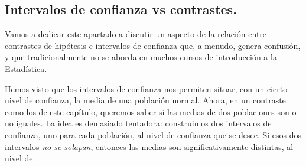 \subsection{Intervalos de confianza vs contrastes.}
\label{cap09:subsec:IntervalosDeConfianzaVsContrastes01}

Vamos a dedicar este apartado a discutir un aspecto de la relación entre contrastes de hipótesis e intervalos de confianza que, a menudo, genera confusión, y que tradicionalmente no se aborda en muchos cursos de introducción a la Estadística.

Hemos visto que los intervalos de confianza nos permiten situar, con un cierto nivel de confianza,
la media de una población normal. Ahora, en un contraste como los de este capítulo, queremos saber
si las medias de dos poblaciones son o no iguales. La idea es demasiado tentadora: construimos dos
intervalos de confianza, uno para cada población, al nivel de confianza que se desee. Si esos dos
intervalos {\em no se solapan}, entonces las medias son significativamente distintas, al nivel de
